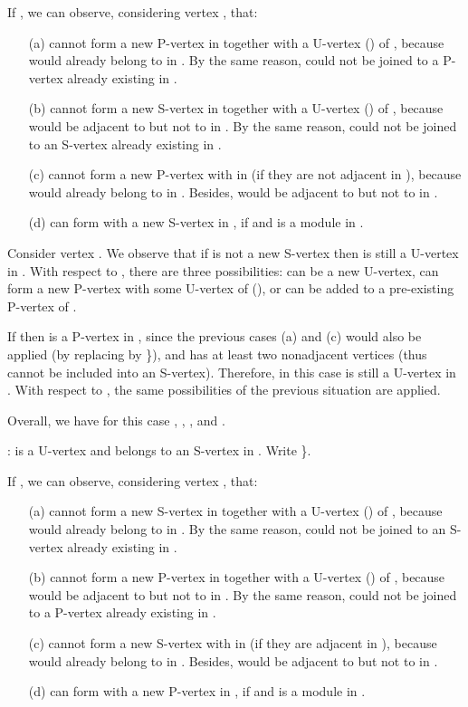 \documentclass[12pt]{article}
\begin{document}
If , we can observe, considering vertex , that:
\begin{itemize}
\item[(a)]  cannot form a new P-vertex in  together with a U-vertex  () of , because  would already belong to  in . By the same reason,  could not be joined to a P-vertex  already existing in .

\item[(b)]  cannot form a new S-vertex in  together with a U-vertex  () of , because  would be adjacent to  but not to  in . By the same reason,  could not be joined to an S-vertex  already existing in .

\item[(c)]  cannot form a new P-vertex with  in  (if they are not adjacent in ), because  would already belong to  in . Besides,  would be adjacent to  but not to  in .

\item[(d)]  can form with  a new S-vertex in , if  and  is a module in .
\end{itemize}

Consider vertex . We observe that if  is not a new S-vertex then  is still a U-vertex in .
With respect to , there are three possibilities:  can be a new U-vertex,  can form a new P-vertex with some U-vertex  of  (), or  can be added to a pre-existing P-vertex  of .

If  then  is a P-vertex in , since the previous cases (a) and (c) would also be applied (by replacing  by \}), and  has at least two nonadjacent vertices (thus cannot be included into an S-vertex). Therefore, in this case  is still a U-vertex in . With respect to , the same possibilities of the previous situation are applied.

Overall,  we have for this case
,
,
, and
.

\medskip


:  is a U-vertex and  belongs to an
S-vertex  in . Write \}.

If , we can observe, considering vertex , that:
\begin{itemize}
\item[(a)]  cannot form a new S-vertex in  together with a U-vertex  () of , because  would already belong to  in . By the same reason,  could not be joined to an S-vertex  already existing in .

\item[(b)]  cannot form a new P-vertex in  together with a U-vertex  () of , because  would be adjacent to  but not to  in . By the same reason,  could not be joined to a P-vertex  already existing in .

\item[(c)]  cannot form a new S-vertex with  in  (if they are adjacent in ), because  would already belong to  in . Besides,  would be adjacent to  but not to  in .

\item[(d)]  can form with  a new P-vertex in , if  and  is a module in .
\end{itemize}
\end{document}
